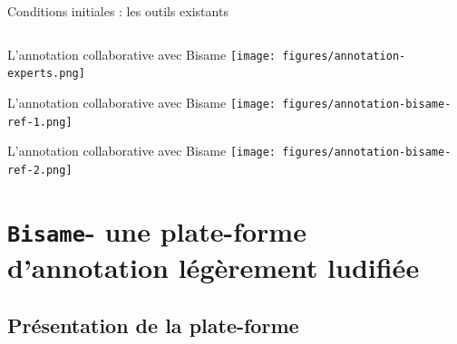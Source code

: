 \documentclass[french]{beamer}
\newcommand{\tool}[1]{\texttt{#1}\xspace}
\begin{document}
\begin{frame}{Conditions initiales : les outils existants}
{\begin{table}[]
{\begin{tabular}{p{2cm}|cccccccccccc}
\\ \toprule            

    \end{tabular}
    }
  \end{table}
  }
\end{frame}


\begin{frame}{L'annotation collaborative avec Bisame}
    \centering
    \texttt{[image: figures/annotation-experts.png]}
\end{frame}

\begin{frame}{L'annotation collaborative avec Bisame}
    \centering
    \texttt{[image: figures/annotation-bisame-ref-1.png]}
\end{frame}


\begin{frame}{L'annotation collaborative avec Bisame}
    \centering
    \texttt{[image: figures/annotation-bisame-ref-2.png]}
\end{frame}



\section{\tool{Bisame}\thinspace - une plate-forme d'annotation légèrement ludifiée}

\subsection{Présentation de la plate-forme}
\end{document}
